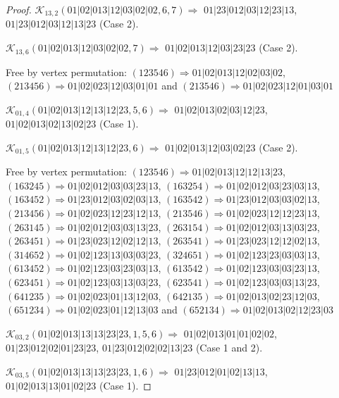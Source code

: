 \documentclass[12pt]{article}
\theoremstyle{plain}
\theoremstyle{definition}
\theoremstyle{remark}
\newcommand{\fancy}[1]{\mathcal{#1}}
\def\K{\fancy{K}}
\begin{document}
\begin{proof}
	
	
	\bigskip
	
	$\K_{13,2}(01|02|013|12|03|02|02,6, 7)\Rightarrow $ $01|23|012|03|12|23|13$, $01|23|012|03|12|13|23$ (Case 2).
	
	$\K_{13,6}(01|02|013|12|03|02|02,7)\Rightarrow $ $01|02|013|12|03|23|23$ (Case 2).
	
	
	
	Free by vertex permutation: $(1 2 3 5 4 6)\Rightarrow 01|02|013|12|02|03|02$, $(2 1 3 4 5 6)\Rightarrow 01|02|023|12|03|01|01$ and $(2 1 3 5 4 6)\Rightarrow 01|02|023|12|01|03|01$
	
	
	
	\bigskip
	
	$\K_{01,4}(01|02|013|12|13|12|23,5, 6)\Rightarrow $ $01|02|013|02|03|12|23$, $01|02|013|02|13|02|23$ (Case 1).
	
	$\K_{01,5}(01|02|013|12|13|12|23,6)\Rightarrow $ $01|02|013|12|03|02|23$ (Case 2).
	
	
	
	Free by vertex permutation: $(1 2 3 5 4 6)\Rightarrow 01|02|013|12|12|13|23$, $(1 6 3 2 4 5)\Rightarrow 01|02|012|03|03|23|13$, $(1 6 3 2 5 4)\Rightarrow 01|02|012|03|23|03|13$, $(1 6 3 4 5 2)\Rightarrow 01|23|012|03|02|03|13$, $(1 6 3 5 4 2)\Rightarrow 01|23|012|03|03|02|13$, $(2 1 3 4 5 6)\Rightarrow 01|02|023|12|23|12|13$, $(2 1 3 5 4 6)\Rightarrow 01|02|023|12|12|23|13$, $(2 6 3 1 4 5)\Rightarrow 01|02|012|03|03|13|23$, $(2 6 3 1 5 4)\Rightarrow 01|02|012|03|13|03|23$, $(2 6 3 4 5 1)\Rightarrow 01|23|023|12|02|12|13$, $(2 6 3 5 4 1)\Rightarrow 01|23|023|12|12|02|13$, $(3 1 4 6 5 2)\Rightarrow 01|02|123|13|03|03|23$, $(3 2 4 6 5 1)\Rightarrow 01|02|123|23|03|03|13$, $(6 1 3 4 5 2)\Rightarrow 01|02|123|03|23|03|13$, $(6 1 3 5 4 2)\Rightarrow 01|02|123|03|03|23|13$, $(6 2 3 4 5 1)\Rightarrow 01|02|123|03|13|03|23$, $(6 2 3 5 4 1)\Rightarrow 01|02|123|03|03|13|23$, $(6 4 1 2 3 5)\Rightarrow 01|02|023|01|13|12|03$, $(6 4 2 1 3 5)\Rightarrow 01|02|013|02|23|12|03$, $(6 5 1 2 3 4)\Rightarrow 01|02|023|01|12|13|03$ and $(6 5 2 1 3 4)\Rightarrow 01|02|013|02|12|23|03$
	
	
	
	\bigskip
	
	$\K_{03,2}(01|02|013|13|13|23|23,1, 5, 6)\Rightarrow $ $01|02|013|01|01|02|02$, $01|23|012|02|01|23|23$, $01|23|012|02|02|13|23$ (Case 1 and 2).
	
	$\K_{03,5}(01|02|013|13|13|23|23,1, 6)\Rightarrow $ $01|23|012|01|02|13|13$, $01|02|013|13|01|02|23$ (Case 1).
	

\end{proof}
\end{document}
